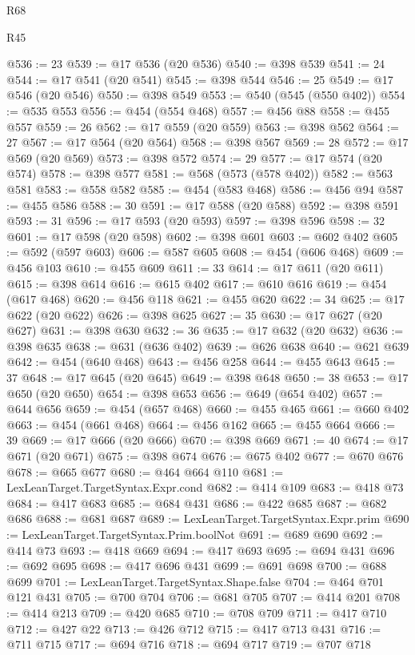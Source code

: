 \begin{lexlean}{R68}
\begin{lexlean}{R45}
\begin{coremodule}
{{{{{{{{{{{{{{{{{{{{{{{{{{{{{{{{{{{{{{{{{{{{{{{{{{{{{{{{{{{{{{{{{{{{{{{{{{{{{{{{{{{{{{{{{{{@536 := 23
@539 := @17 @536 (@20 @536)
@540 := @398 @539
@541 := 24
@544 := @17 @541 (@20 @541)
@545 := @398 @544
@546 := 25
@549 := @17 @546 (@20 @546)
@550 := @398 @549
@553 := @540 (@545 (@550 @402))
@554 := @535 @553
@556 := @454 (@554 @468)
@557 := @456 @88
@558 := @455 @557
@559 := 26
@562 := @17 @559 (@20 @559)
@563 := @398 @562
@564 := 27
@567 := @17 @564 (@20 @564)
@568 := @398 @567
@569 := 28
@572 := @17 @569 (@20 @569)
@573 := @398 @572
@574 := 29
@577 := @17 @574 (@20 @574)
@578 := @398 @577
@581 := @568 (@573 (@578 @402))
@582 := @563 @581
@583 := @558 @582
@585 := @454 (@583 @468)
@586 := @456 @94
@587 := @455 @586
@588 := 30
@591 := @17 @588 (@20 @588)
@592 := @398 @591
@593 := 31
@596 := @17 @593 (@20 @593)
@597 := @398 @596
@598 := 32
@601 := @17 @598 (@20 @598)
@602 := @398 @601
@603 := @602 @402
@605 := @592 (@597 @603)
@606 := @587 @605
@608 := @454 (@606 @468)
@609 := @456 @103
@610 := @455 @609
@611 := 33
@614 := @17 @611 (@20 @611)
@615 := @398 @614
@616 := @615 @402
@617 := @610 @616
@619 := @454 (@617 @468)
@620 := @456 @118
@621 := @455 @620
@622 := 34
@625 := @17 @622 (@20 @622)
@626 := @398 @625
@627 := 35
@630 := @17 @627 (@20 @627)
@631 := @398 @630
@632 := 36
@635 := @17 @632 (@20 @632)
@636 := @398 @635
@638 := @631 (@636 @402)
@639 := @626 @638
@640 := @621 @639
@642 := @454 (@640 @468)
@643 := @456 @258
@644 := @455 @643
@645 := 37
@648 := @17 @645 (@20 @645)
@649 := @398 @648
@650 := 38
@653 := @17 @650 (@20 @650)
@654 := @398 @653
@656 := @649 (@654 @402)
@657 := @644 @656
@659 := @454 (@657 @468)
@660 := @455 @465
@661 := @660 @402
@663 := @454 (@661 @468)
@664 := @456 @162
@665 := @455 @664
@666 := 39
@669 := @17 @666 (@20 @666)
@670 := @398 @669
@671 := 40
@674 := @17 @671 (@20 @671)
@675 := @398 @674
@676 := @675 @402
@677 := @670 @676
@678 := @665 @677
@680 := @464 @664 @110
@681 := LexLeanTarget.TargetSyntax.Expr.cond
@682 := @414 @109
@683 := @418 @73
@684 := @417 @683
@685 := @684 @431
@686 := @422 @685
@687 := @682 @686
@688 := @681 @687
@689 := LexLeanTarget.TargetSyntax.Expr.prim
@690 := LexLeanTarget.TargetSyntax.Prim.boolNot
@691 := @689 @690
@692 := @414 @73
@693 := @418 @669
@694 := @417 @693
@695 := @694 @431
@696 := @692 @695
@698 := @417 @696 @431
@699 := @691 @698
@700 := @688 @699
@701 := LexLeanTarget.TargetSyntax.Shape.false
@704 := @464 @701 @121 @431
@705 := @700 @704
@706 := @681 @705
@707 := @414 @201
@708 := @414 @213
@709 := @420 @685
@710 := @708 @709
@711 := @417 @710
@712 := @427 @22
@713 := @426 @712
@715 := @417 @713 @431
@716 := @711 @715
@717 := @694 @716
@718 := @694 @717
@719 := @707 @718
}}}}}}}}}}}}}}}}}}}}}}}}}}}}}}}}}}}}}}}}}}}}}}}}}}}}}}}}}}}}}}}}}}}}}}}}}}}}}}}}}}}}}}}}}}}
\end{coremodule}
\end{lexlean}
\end{lexlean}
